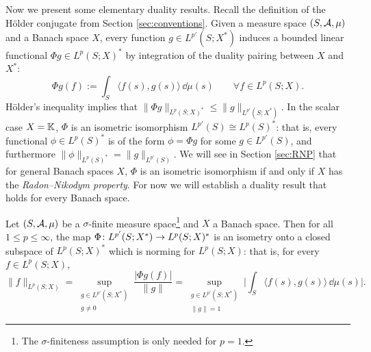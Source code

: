 Now we present some elementary duality results.
Recall the definition of the H\"older conjugate from Section \ref{sec:conventions}.
Given a measure space $(S,\mathcal{A},\mu)$ and a Banach space $X$, every function $g \in L^{p'}(S;X^*)$ induces a bounded linear functional $\Phi g \in L^p(S;X)^*$ by integration of the duality pairing between $X$ and $X^*$:
\begin{equation*}
  \Phi g(f) := \int_S \langle f(s), g(s) \rangle \, \dd\mu(s) \qquad \forall f \in L^p(S;X).
\end{equation*}
H\"older's inequality implies that $\|\Phi g\|_{L^p(S;X)^*} \leq \|g\|_{L^{p'}(S;X^*)}$.
In the scalar case $X = \mathbb{K}$, $\Phi$ is an isometric isomorphism $L^{p'}(S) \cong L^p(S)^*$: that is, every functional $\phi \in L^p(S)^*$ is of the form $\phi = \Phi g$ for some $g \in L^{p'}(S)$, and furthermore $\|\phi\|_{L^p(S)^*} = \|g\|_{L^{p'}(S)}$.
We will see in Section \ref{sec:RNP} that for general Banach spaces $X$, $\Phi$ is an isometric isomorphism if and only if $X$ has the \emph{Radon--Nikodym property}.
For now we will establish a duality result that holds for every Banach space.

\begin{prop}\label{prop:bochner-preduality}
  Let $(S,\mathcal{A},\mu)$ be a $\sigma$-finite measure space\footnote{The $\sigma$-finiteness assumption is only needed for $p = 1$.} and $X$ a Banach space.
  Then for all $1 \leq p \leq \infty$, the map $\Phi \colon L^{p'}(S;X^*) \rightarrow L^p(S;X)^*$ is an isometry onto a closed subspace of $L^p(S;X)^*$ which is norming for $L^p(S;X)$: that is, for every $f \in L^p(S;X)$,
  \begin{equation*}
    \|f\|_{L^p(S;X)} = \sup_{\substack{g \in L^{p'}(S;X^*) \\ g \neq 0}} \frac{| \Phi g(f) |}{\|g\|}
    = \sup_{\substack{g \in L^{p'}(S;X^*) \\ \|g\| = 1}} \Big| \int_S \langle f(s), g(s) \rangle \, \dd\mu(s) \Big|.
  \end{equation*}
\end{prop}

